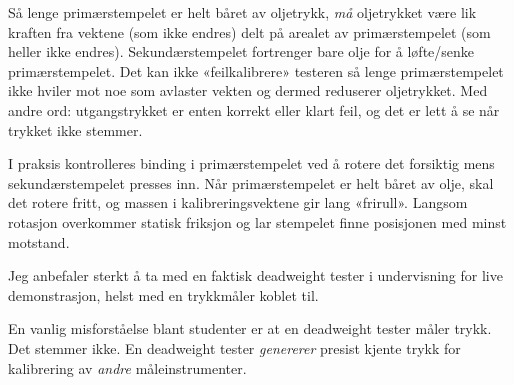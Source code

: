 





Så lenge primærstempelet er helt båret av oljetrykk, {\it må} oljetrykket være lik kraften fra vektene (som ikke endres) delt på arealet av primærstempelet (som heller ikke endres). Sekundærstempelet fortrenger bare olje for å løfte/senke primærstempelet. Det kan ikke «feilkalibrere» testeren så lenge primærstempelet ikke hviler mot noe som avlaster vekten og dermed reduserer oljetrykket. Med andre ord: utgangstrykket er enten korrekt eller klart feil, og det er lett å se når trykket ikke stemmer.

I praksis kontrolleres binding i primærstempelet ved å rotere det forsiktig mens sekundærstempelet presses inn. Når primærstempelet er helt båret av olje, skal det rotere fritt, og massen i kalibreringsvektene gir lang «frirull». Langsom rotasjon overkommer statisk friksjon og lar stempelet finne posisjonen med minst motstand.

Jeg anbefaler sterkt å ta med en faktisk deadweight tester i undervisning for live demonstrasjon, helst med en trykkmåler koblet til.

\vskip 10pt

En vanlig misforståelse blant studenter er at en deadweight tester måler trykk. Det stemmer ikke. En deadweight tester {\it genererer} presist kjente trykk for kalibrering av {\it andre} måleinstrumenter.


